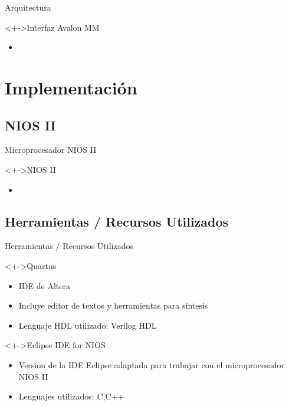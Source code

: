 \documentclass[xcolor=dvipsnames]{beamer}
\begin{document}
\begin{frame}{Arquitectura}
  \begin{block}<+->{Interfaz Avalon MM}   
    \begin{itemize}
      \scriptsize
     	\item
    \end{itemize}
  \end{block}
\end{frame}

\section{Implementación}
\subsection{NIOS II}
\begin{frame}{Microprocesador NIOS II}
  \begin{block}<+->{NIOS II}   
    \begin{itemize}
      \scriptsize
     	\item
    \end{itemize}
  \end{block}
\end{frame}

\subsection{Herramientas / Recursos Utilizados}
\begin{frame}{Herramientas / Recursos Utilizados}
\begin{block}<+->{Quartus}   
    \begin{itemize}
      \scriptsize
     	\item IDE de Altera
	\item Incluye editor de textos y herramientas para síntesis
	\item Lenguaje HDL utilizado: Verilog HDL
    \end{itemize} 
  \end{block}
  \begin{block}<+->{Eclipse IDE for NIOS}   
    \begin{itemize}
      \scriptsize
     	\item Version de la IDE Eclipse adaptada para trabajar con el microprocesador NIOS II
	\item Lenguajes utilizados: C,C++
    \end{itemize}	
  \end{block}
\end{frame}
\end{document}
